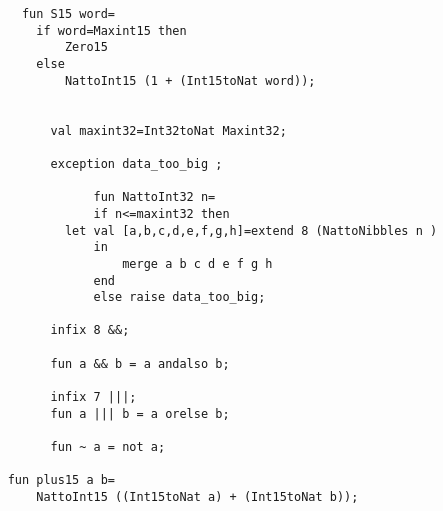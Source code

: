\begin{verbatim}
	  fun S15 word=
		if word=Maxint15 then
			Zero15
		else
			NattoInt15 (1 + (Int15toNat word));

           
          val maxint32=Int32toNat Maxint32; 
           
          exception data_too_big ;
 
                fun NattoInt32 n= 
                if n<=maxint32 then  
			let val [a,b,c,d,e,f,g,h]=extend 8 (NattoNibbles n )
				in
					merge a b c d e f g h
				end
                else raise data_too_big; 

          infix 8 &&;

          fun a && b = a andalso b;

          infix 7 |||;
          fun a ||| b = a orelse b;

          fun ~ a = not a;

	fun plus15 a b=
		NattoInt15 ((Int15toNat a) + (Int15toNat b));
\end{verbatim}
